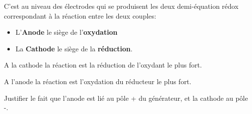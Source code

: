 \documentclass[11pt,a4paper]{article}
\begin{document}
C'est au niveau des électrodes qui se produisent les deux demi-équation rédox correspondant à la réaction entre les deux couples:
\begin{itemize}
    \item L'\textbf{Anode} le siège de  l'\textbf{oxydation}
    \item La \textbf{Cathode} le siège de la \textbf{réduction}. 
\end{itemize}

\begin{mdframed}[backgroundcolor=red!2]
A la cathode la réaction est la réduction de l'oxydant le plus fort. 

A l'anode la réaction est l'oxydation du réducteur le plus fort. 
\end{mdframed}

\begin{exo}
Justifier le fait que l'anode est lié au pôle + du générateur, et la cathode au pôle -. 
\vspace{3.5cm}
\end{exo}
\end{document}
